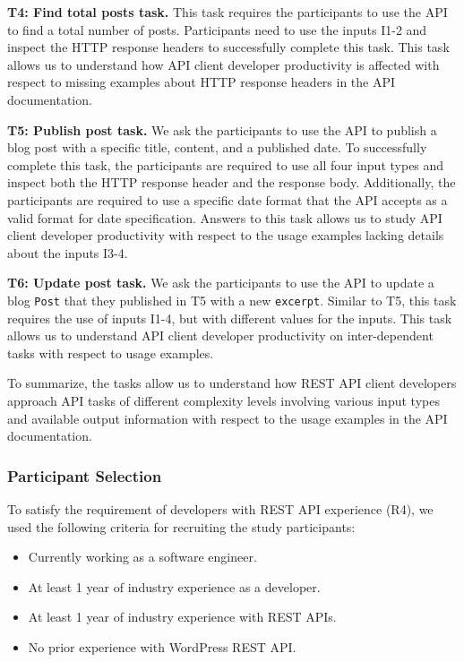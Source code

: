 \textbf{T4: Find total posts task.} This task requires the participants to use the API to find a total number of posts. Participants need to use the inputs I1-2 and inspect the HTTP response headers to successfully complete this task. This task allows us to understand how API client developer productivity is affected with respect to missing examples about HTTP response headers in the API documentation.

\textbf{T5: Publish post task.} We ask the participants to use the API to publish a blog post with a specific title, content, and a published date. To successfully complete this task, the participants are required to use all four input types and inspect both the HTTP response header and the response body. Additionally, the participants are required to use a specific date format that the API accepts as a valid format for date specification. Answers to this task allows us to study API client developer productivity with respect to the usage examples lacking details about the inputs I3-4.

\textbf{T6: Update post task.} We ask the participants to use the API to update a blog \lstinline{Post} that they published in T5 with a new \lstinline{excerpt}. Similar to T5, this task requires the use of inputs I1-4, but with different values for the inputs. This task allows us to understand API client developer productivity on inter-dependent tasks with respect to usage examples.

To summarize, the tasks allow us to understand how REST API client developers approach API tasks of different complexity levels involving various input types and available output information with respect to the usage examples in the API documentation.

\subsubsection{Participant Selection} %

To satisfy the requirement of developers with REST API experience (R4), we used the following criteria for recruiting the study participants:

\begin{itemize}
  \item Currently working as a software engineer.
  \item At least 1 year of industry experience as a developer.
  \item At least 1 year of industry experience with REST APIs.
  \item No prior experience with WordPress REST API.
\end{itemize}



